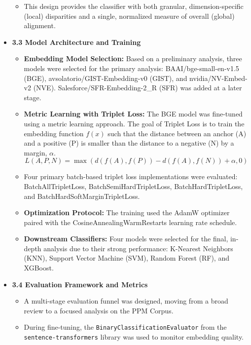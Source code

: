 \documentclass[11pt]{article}
\begin{document}
\begin{itemize}
\begin{itemize}
        \item This design provides the classifier with both granular, dimension-specific (local) disparities and a single, normalized measure of overall (global) alignment.
    \end{itemize}
    \item \textbf{3.3 Model Architecture and Training}
    \begin{itemize}
        \item \textbf{Embedding Model Selection:} Based on a preliminary analysis, three models were selected for the primary analysis: BAAI/bge-small-en-v1.5 (BGE), avsolatorio/GIST-Embedding-v0 (GIST), and nvidia/NV-Embed-v2 (NVE). Salesforce/SFR-Embedding-2\_R (SFR) was added at a later stage.
        \item \textbf{Metric Learning with Triplet Loss:} The BGE model was fine-tuned using a metric learning approach. The goal of Triplet Loss is to train the embedding function $f(x)$ such that the distance between an anchor (A) and a positive (P) is smaller than the distance to a negative (N) by a margin, $\alpha$.
        \begin{equation*}
            L(A, P, N) = \max(d(f(A), f(P)) - d(f(A), f(N)) + \alpha, 0)
        \end{equation*}
        \item Four primary batch-based triplet loss implementations were evaluated: BatchAllTripletLoss, BatchSemiHardTripletLoss, BatchHardTripletLoss, and BatchHardSoftMarginTripletLoss.
        \item \textbf{Optimization Protocol:} The training used the AdamW optimizer paired with the CosineAnnealingWarmRestarts learning rate schedule.
        \item \textbf{Downstream Classifiers:} Four models were selected for the final, in-depth analysis due to their strong performance: K-Nearest Neighbors (KNN), Support Vector Machine (SVM), Random Forest (RF), and XGBoost.
    \end{itemize}
    \item \textbf{3.4 Evaluation Framework and Metrics}
    \begin{itemize}
        \item A multi-stage evaluation funnel was designed, moving from a broad review to a focused analysis on the PPM Corpus.
        \item During fine-tuning, the \texttt{BinaryClassificationEvaluator} from the \texttt{sentence-transformers} library was used to monitor embedding quality.

\end{itemize}
\end{itemize}
\end{document}
